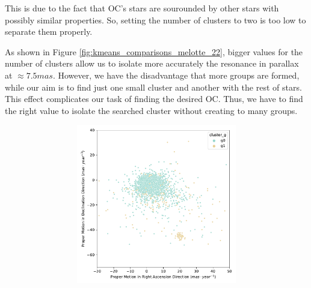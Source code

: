 \documentclass[11pt, a4paper, english]{book}
\begin{document}
This is due to the fact that OC's stars are sourounded by other stars with possibly similar properties. So, setting the number of clusters
to two is too low to separate them properly.

As shown in Figure \ref{fig:kmeans_comparisons_melotte_22}, bigger values for the number of clusters allow us to isolate more accurately
the resonance in parallax at $\approx 7.5mas$. However, we have the disadvantage that more groups are formed, while our aim is to find just
one small cluster and another with the rest of stars. This effect complicates our task of finding the desired OC. Thus, we have to find
the right value to isolate the searched cluster without creating to many groups.

\begin{figure}[htbp]
  \centering
  \begin{subfigure}{0.9\textwidth}
    \centering
    \begin{subfigure}[t]{0.3\textwidth}
      \centering
      \includegraphics[width=\textwidth]{../figures/kmeans_n2_pm_melotte_22.pdf}
    \end{subfigure}
    \hfill
    \begin{subfigure}[t]{0.3\textwidth}
      \centering

\end{subfigure}
\end{subfigure}
\end{figure}
\end{document}
